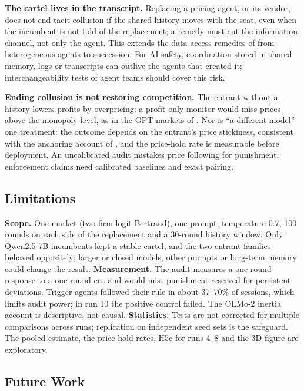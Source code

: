\documentclass[11pt]{article}
\begin{document}
\textbf{The cartel lives in the transcript.} Replacing a pricing agent, or its vendor, does not end tacit
collusion if the shared history moves with the seat, even when the incumbent is not told of the
replacement; a remedy must cut the information channel, not only the agent. This extends the data-access remedies of
\citet{keppo2026fragility} from heterogeneous agents to succession. For AI safety, coordination stored in
shared memory, logs or transcripts can outlive the agents that created it; interchangeability tests
of agent teams \citep{gao2026interchangeability} should cover this risk.

\textbf{Ending collusion is not restoring competition.} The entrant without a history lowers profits by
overpricing; a profit-only monitor would miss prices above the monopoly level, as in the GPT markets
of \citet{lee2026leads}. Nor is ``a different model'' one treatment: the outcome depends on the entrant's
price stickiness, consistent with the anchoring account of \citet{tran2026enforcing}, and the price-hold
rate is measurable before deployment. An uncalibrated audit mistakes price following for
punishment; enforcement claims need calibrated baselines and exact pairing.

\hypertarget{limitations}{%
\subsection*{Limitations}\label{limitations}}

\textbf{Scope.} One market (two-firm logit Bertrand), one prompt, temperature 0.7, 100 rounds on each
side of the replacement and a 30-round history window. Only Qwen2.5-7B incumbents kept a stable
cartel, and the two entrant families behaved oppositely; larger or closed models, other prompts or
long-term memory could change the result. \textbf{Measurement.} The audit measures a one-round response
to a one-round cut and would miss punishment reserved for persistent deviations. Trigger agents
followed their rule in about 37--70\% of sessions, which limits audit power; in run 10 the positive
control failed. The OLMo-2 inertia account is descriptive, not causal. \textbf{Statistics.} Tests are
not corrected for multiple comparisons across runs; replication on independent seed sets is the
safeguard. The pooled estimate, the price-hold rates, H5c for runs 4--8 and the 3D figure are
exploratory.

\hypertarget{future-work}{%
\subsection*{Future Work}\label{future-work}}
\end{document}
